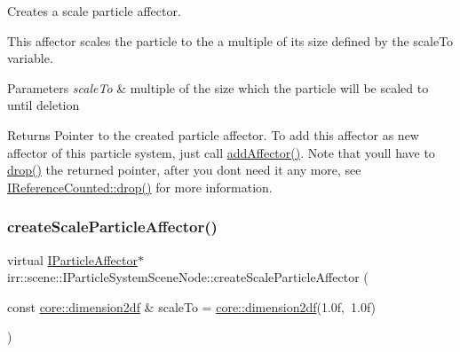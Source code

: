 Creates a scale particle affector. 

This affector scales the particle to the a multiple of its size defined by the scale\+To variable. 
\begin{DoxyParams}{Parameters}
{\em scale\+To} & multiple of the size which the particle will be scaled to until deletion \\
\hline
\end{DoxyParams}
\begin{DoxyReturn}{Returns}
Pointer to the created particle affector. To add this affector as new affector of this particle system, just call \hyperlink{classirr_1_1scene_1_1IParticleSystemSceneNode_a401f5afbbb748878011c5ceb7d447f8b}{add\+Affector()}. Note that you\textquotesingle{}ll have to \hyperlink{classirr_1_1IReferenceCounted_a03856a09355b89d178090c4a5f738543}{drop()} the returned pointer, after you don\textquotesingle{}t need it any more, see \hyperlink{classirr_1_1IReferenceCounted_a03856a09355b89d178090c4a5f738543}{I\+Reference\+Counted\+::drop()} for more information. 
\end{DoxyReturn}
\mbox{\label{classirr_1_1scene_1_1IParticleSystemSceneNode_a015692bb57e0b6dfff1de96975b3bc74}} 
\subsubsection{\texorpdfstring{create\+Scale\+Particle\+Affector()}{createScaleParticleAffector()}\hspace{0.1cm}{\footnotesize\ttfamily [2/2]}}
{\footnotesize\ttfamily virtual \hyperlink{classirr_1_1scene_1_1IParticleAffector}{I\+Particle\+Affector}$\ast$ irr\+::scene\+::\+I\+Particle\+System\+Scene\+Node\+::create\+Scale\+Particle\+Affector (\begin{DoxyParamCaption}\item[{const \hyperlink{namespaceirr_1_1core_a54f0e5b7416e6dce5a0f6213f00a580f}{core\+::dimension2df} \&}]{scale\+To = {\ttfamily \hyperlink{namespaceirr_1_1core_a54f0e5b7416e6dce5a0f6213f00a580f}{core\+::dimension2df}(1.0f,~1.0f)} }\end{DoxyParamCaption})\hspace{0.3cm}{\ttfamily [pure virtual]}}



